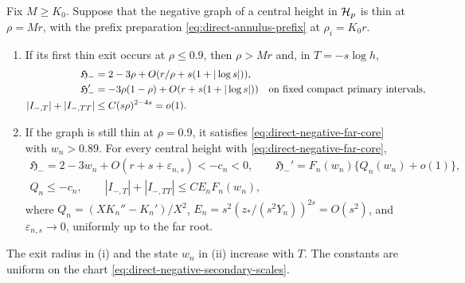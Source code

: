 \begin{lemma}
\label{lem:negative-branch-far-root}
Fix \(M\ge K_0\). Suppose that the negative graph of a central
height in \(\mathcal H_p\) is thin at \(\rho=Mr\), with the prefix preparation
\eqref{eq:direct-annulus-prefix} at \(\rho_i=K_0r\).
\begin{enumerate}[label=\textup{(\roman*)}]
\item If its first thin exit occurs at \(\rho\le0.9\), then \(\rho>Mr\)
and, in \(T=-s\log h\),
\begin{equation}
\label{eq:direct-negative-primary-rates}
 \begin{split}
 \mathfrak H_-&=2-3\rho+
                O(r/\rho+s(1+|\log s|)),\\
 \mathfrak H_-'&=-3\rho(1-\rho)
                +O(r+s(1+|\log s|))
 \quad\hbox{on fixed compact primary intervals},\\
 |I_{-,T}|+|I_{-,TT}|&\le C(s\rho)^{2-4s}=o(1).
 \end{split}
\end{equation}
\item If the graph is still thin at \(\rho=0.9\), it satisfies
\eqref{eq:direct-negative-far-core} with \(w_n>0.89\). For every central
height with \eqref{eq:direct-negative-far-core},
\begin{equation}
\label{eq:direct-negative-far-rate}
 \begin{gathered}
 \mathfrak H_-=2-3w_n+O(r+s+\varepsilon_{n,s})<-c_n<0,\qquad
 \mathfrak H_-'=F_n(w_n)\{Q_n(w_n)+o(1)\},\\
 Q_n\le-c_n,\qquad |I_{-,T}|+|I_{-,TT}|\le CE_nF_n(w_n),
 \end{gathered}
\end{equation}
where \(Q_n=(XK_n''-K_n')/X^2\), \(E_n=s^2(z_*/(s^2Y_n))^{2s}=O(s^2)\),
and \(\varepsilon_{n,s}\to0\), uniformly up to the far root.
\end{enumerate}
The exit radius in (i) and the state \(w_n\) in (ii) increase with \(T\).
The constants are uniform on the chart
\eqref{eq:direct-negative-secondary-scales}.
\end{lemma}


